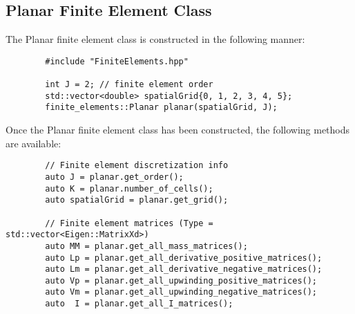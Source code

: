 \documentclass[../main.tex]{subfiles}
\begin{document}
    \subsection{Planar Finite Element Class}
    The Planar finite element class is constructed in the following manner:
    \begin{verbatim}
        #include "FiniteElements.hpp"
        
        int J = 2; // finite element order
        std::vector<double> spatialGrid{0, 1, 2, 3, 4, 5};
        finite_elements::Planar planar(spatialGrid, J);
    \end{verbatim}
    Once the Planar finite element class has been constructed, the following methods are available:
    \begin{verbatim}
        // Finite element discretization info
        auto J = planar.get_order();
        auto K = planar.number_of_cells();
        auto spatialGrid = planar.get_grid();
        
        // Finite element matrices (Type = std::vector<Eigen::MatrixXd>)
        auto MM = planar.get_all_mass_matrices();
        auto Lp = planar.get_all_derivative_positive_matrices();
        auto Lm = planar.get_all_derivative_negative_matrices();
        auto Vp = planar.get_all_upwinding_positive_matrices();
        auto Vm = planar.get_all_upwinding_negative_matrices();
        auto  I = planar.get_all_I_matrices();
    \end{verbatim}
    
\end{document}
